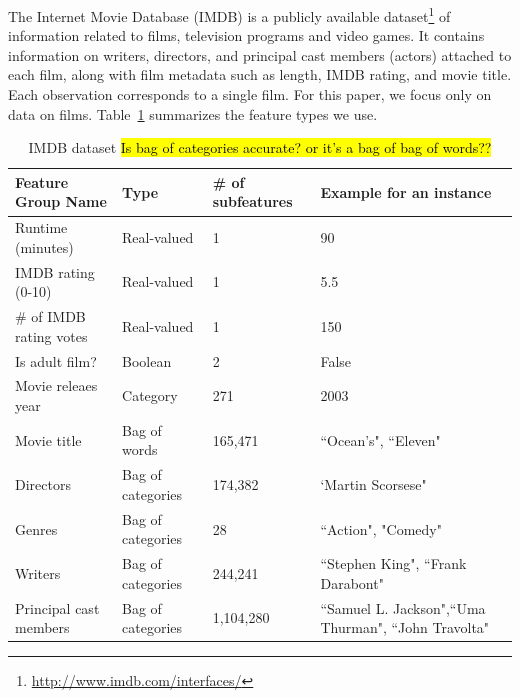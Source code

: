 \documentclass{article} %
\begin{document}
The Internet Movie Database (IMDB) is a publicly available dataset\footnote{\href{http://www.imdb.com/interfaces/}{http://www.imdb.com/interfaces/}} of information related to films, television programs and video games.
It contains information on writers, directors, and principal cast members (actors) attached to each film, along with film metadata such as length, IMDB rating, and movie title. 
Each observation corresponds to a single film. 
For this paper, we focus only on data on films. 
Table~\ref{tab:features} summarizes the feature types we use.

\begin{table}[htb]
\centering
\caption{IMDB dataset \hl{Is bag of categories accurate? or it's a bag of bag of words??}}
\label{tab:features}
\begin{tabular}{@{}lllp{5cm}@{}}
\toprule
Feature Group Name      & Type              & \# of subfeatures & Example for an instance                                      \\ \midrule
Runtime (minutes)       & Real-valued       & 1                 & 90                                                           \\
IMDB rating (0-10)      & Real-valued       & 1                 & 5.5                                                          \\
\# of IMDB rating votes & Real-valued       & 1                 & 150                                                          \\ 
Is adult film?          & Boolean           & 2                 & False                                                        \\
Movie releaes year      & Category          & 271               & 2003                                                         \\
Movie title             & Bag of words      & 165,471           & ``Ocean's", ``Eleven"                                  \\
Directors               & Bag of categories & 174,382           & `Martin Scorsese"                                     \\
Genres                  & Bag of categories & 28                &``Action", "Comedy"                                 \\
Writers                 & Bag of categories & 244,241           &``Stephen King", ``Frank Darabont"                      \\
Principal cast members  & Bag of categories & 1,104,280         &``Samuel L. Jackson",``Uma Thurman", ``John Travolta" \\\bottomrule
\end{tabular}
\end{table}
\end{document}
